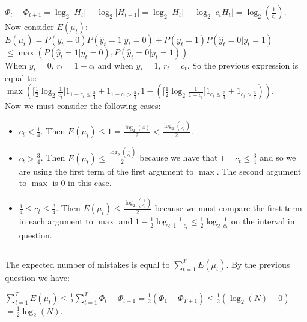 \documentclass[]{article}
\begin{document}
$\Phi_t - \Phi_{t+1} = \log_2 \vert H_t \vert - \log_2 \vert H_{t+1} \vert = \log_2 \vert H_t \vert - \log_2 \vert c_t H_{t} \vert = \log_2(\frac{1}{c_t})$.\\

\noindent Now consider $E(\mu_t)$:\\

$E(\mu_t) = P(y_t = 0) P(\hat{y}_t = 1 \vert y_t = 0) + P(y_t = 1) P(\hat{y}_t = 0 \vert y_t = 1)$\\

$\le \max(P(\hat{y}_t = 1 \vert y_t = 0), P(\hat{y}_t = 0 \vert y_t = 1))$ \\

\noindent When $y_t = 0$, $r_t = 1 - c_t$ and when $y_t = 1$, $r_t = c_t$. So the previous expression is equal to:\\

$\max(\lbrack \frac{1}{2} \log_2 \frac{1}{c_t} \rbrack 1_{1-c_t \le \frac{3}{4}} + 1_{1-c_t > \frac{3}{4}}, 1 - (\lbrack \frac{1}{2} \log_2 \frac{1}{1-c_t} \rbrack 1_{c_t \le \frac{3}{4}} + 1_{c_t > \frac{3}{4}}))$.\\

\noindent Now we must consider the following cases:
\begin{itemize}
	\item $c_t < \frac{1}{4}$. Then $E(\mu_t) \le 1 = \frac{\log_2(4)}{2} < \frac{\log_2(\frac{1}{c_t})}{2}$.
	\item $c_t > \frac{3}{4}$. Then $E(\mu_t) \le \frac{\log_2(\frac{1}{c_t})}{2}$ because we have that $1 - c_t \le \frac{3}{4}$ and so we are using the first term of the first argument to $\max$. The second argument to $\max$ is 0 in this case.
	\item $\frac{1}{4} \le c_t \le \frac{3}{4}$. Then $E(\mu_t) \le \frac{\log_2(\frac{1}{c_t})}{2}$ because we must compare the first term in each argument to $\max$ and $1 - \frac{1}{2} \log_2 \frac{1}{1-c_t} \le \frac{1}{2} \log_2 \frac{1}{c_t}$ on the interval in question.
	
\end{itemize}

\subsection{}

The expected number of mistakes is equal to $\sum_{t=1}^{T} E(\mu_t)$. By the previous question we have:

$\sum_{t=1}^{T} E(\mu_t) \le \frac{1}{2} \sum_{t=1}^{T} \Phi_t - \Phi_{t+1} = \frac{1}{2} (\Phi_1 - \Phi_{T+1}) \le \frac{1}{2}(\log_2(N) - 0)$\\

$ = \frac{1}{2} \log_2(N)$.

\subsection{}
\end{document}
